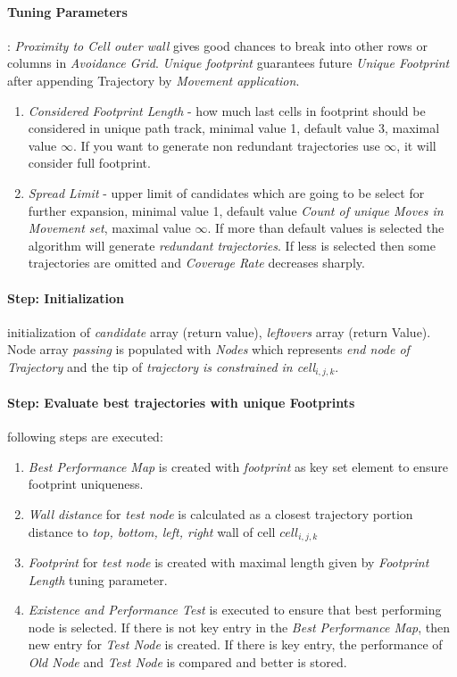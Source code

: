 \paragraph{Tuning Parameters}: \emph{Proximity to Cell outer wall} gives good chances to break into other rows or columns in \emph{Avoidance Grid}. \emph{Unique footprint} guarantees future \emph{Unique Footprint} after appending Trajectory by \emph{Movement application}. 
\begin{enumerate}
    \item \emph{Considered Footprint Length} - how much last cells in footprint should be considered in unique path track, minimal value 1, default value 3, maximal value $\infty$. If you want to generate non redundant trajectories use $\infty$, it will consider full footprint.
    
    \item \emph{Spread Limit} - upper limit of candidates which are going to be select for further expansion, minimal value 1, default value \emph{Count of unique Moves in Movement set}, maximal value $\infty$. If more than default values is selected the algorithm will generate \emph{redundant trajectories}. If less is selected then some trajectories are omitted and \emph{Coverage Rate} decreases sharply. 
\end{enumerate}


\paragraph{Step: Initialization} initialization of \emph{candidate} array (return value), \emph{leftovers} array (return Value). Node array \emph{passing} is populated with \emph{Nodes} which represents \emph{end node of Trajectory} and the tip of \emph{trajectory is constrained in \emph{cell}$_{i,j,k}$}.

\paragraph{Step: Evaluate best trajectories with unique Footprints} following steps are executed:
\begin{enumerate}
    \item \emph{Best Performance Map} is created with \emph{footprint} as key set element to ensure footprint uniqueness.
    \item \emph{Wall distance} for \emph{test node} is calculated as a closest trajectory portion distance to \emph{top, bottom, left, right} wall of cell $cell_{i,j,k}$
    \item \emph{Footprint} for \emph{test node} is created with maximal length given by \emph{Footprint Length} tuning parameter.
    \item \emph{Existence and Performance Test} is executed to ensure that best performing node is selected. If there is not key entry in the \emph{Best Performance Map}, then new entry for \emph{Test Node} is created. If there is key entry, the performance of \emph{Old Node} and \emph{Test Node} is compared and better is stored.
\end{enumerate}

